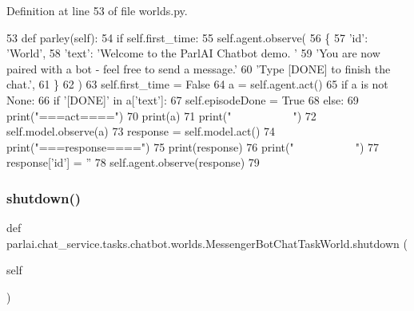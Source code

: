 Definition at line 53 of file worlds.\+py.


\begin{DoxyCode}
53     \textcolor{keyword}{def }parley(self):
54         \textcolor{keywordflow}{if} self.first\_time:
55             self.agent.observe(
56                 \{
57                     \textcolor{stringliteral}{'id'}: \textcolor{stringliteral}{'World'},
58                     \textcolor{stringliteral}{'text'}: \textcolor{stringliteral}{'Welcome to the ParlAI Chatbot demo. '}
59                     \textcolor{stringliteral}{'You are now paired with a bot - feel free to send a message.'}
60                     \textcolor{stringliteral}{'Type [DONE] to finish the chat.'},
61                 \}
62             )
63             self.first\_time = \textcolor{keyword}{False}
64         a = self.agent.act()
65         \textcolor{keywordflow}{if} a \textcolor{keywordflow}{is} \textcolor{keywordflow}{not} \textcolor{keywordtype}{None}:
66             \textcolor{keywordflow}{if} \textcolor{stringliteral}{'[DONE]'} \textcolor{keywordflow}{in} a[\textcolor{stringliteral}{'text'}]:
67                 self.episodeDone = \textcolor{keyword}{True}
68             \textcolor{keywordflow}{else}:
69                 print(\textcolor{stringliteral}{"===act===="})
70                 print(a)
71                 print(\textcolor{stringliteral}{"~~~~~~~~~~~"})
72                 self.model.observe(a)
73                 response = self.model.act()
74                 print(\textcolor{stringliteral}{"===response===="})
75                 print(response)
76                 print(\textcolor{stringliteral}{"~~~~~~~~~~~"})
77                 response[\textcolor{stringliteral}{'id'}] = \textcolor{stringliteral}{''}
78                 self.agent.observe(response)
79 
\end{DoxyCode}
\mbox{\label{classparlai_1_1chat__service_1_1tasks_1_1chatbot_1_1worlds_1_1MessengerBotChatTaskWorld_a53f0006a0960cc68238badfc5eb44b06}} 
\subsubsection{\texorpdfstring{shutdown()}{shutdown()}}
{\footnotesize\ttfamily def parlai.\+chat\+\_\+service.\+tasks.\+chatbot.\+worlds.\+Messenger\+Bot\+Chat\+Task\+World.\+shutdown (\begin{DoxyParamCaption}\item[{}]{self }\end{DoxyParamCaption})}




